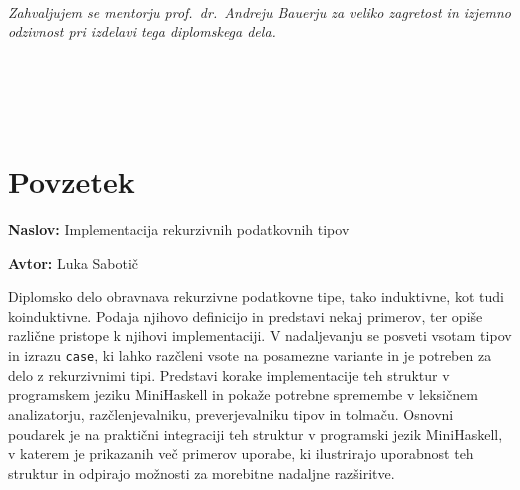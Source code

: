 \documentclass[12pt,a4paper,openany]{book}
\newcommand{\ttitle}{Implementacija rekurzivnih podatkovnih tipov}
\newcommand{\tauthor}{Luka Sabotič}
\begin{document}
\ \thispagestyle{empty}

\newpage


\thispagestyle{empty}\mbox{}\vfill\null\it%
\noindent
Zahvaljujem se mentorju prof.\ dr.\ Andreju Bauerju za veliko zagretost in izjemno odzivnost pri izdelavi tega diplomskega dela.
\rm\normalfont


\newpage


\ \thispagestyle{empty}

\newpage


\thispagestyle{empty}

$\;$ 


\newpage



\ \thispagestyle{empty}

\newpage


\renewcommand\thepage{} 
\tableofcontents 
\renewcommand\thepage{\arabic{page}}

\thispagestyle{empty}



\clearpage{\pagestyle{empty}\cleardoublepage}

{}
\chapter*{Povzetek}

\noindent\textbf{Naslov:} \ttitle
\bigskip

\noindent\textbf{Avtor:} \tauthor
\bigskip

\noindent Diplomsko delo obravnava rekurzivne podatkovne tipe, tako induktivne, kot tudi koinduktivne. Podaja njihovo definicijo in predstavi nekaj 
primerov, ter opiše različne pristope k njihovi implementaciji. V nadaljevanju se posveti vsotam tipov in izrazu \lstinline{case}, ki lahko razčleni 
vsote na posamezne variante in je potreben za delo z rekurzivnimi tipi. Predstavi korake implementacije teh struktur v programskem jeziku 
MiniHaskell in pokaže potrebne spremembe v leksičnem analizatorju, razčlenjevalniku, preverjevalniku tipov in tolmaču. Osnovni poudarek je 
na praktični integraciji teh struktur v programski jezik MiniHaskell, v katerem je prikazanih več primerov uporabe, ki ilustrirajo uporabnost 
teh struktur in odpirajo možnosti za morebitne nadaljne razširitve.
\end{document}
